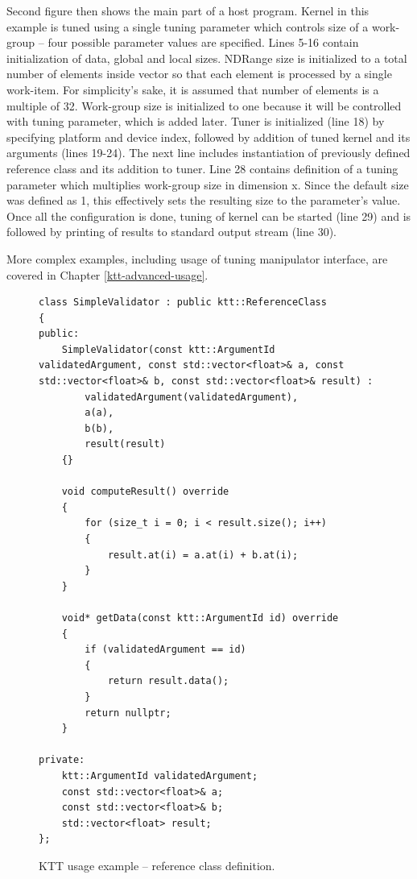 \documentclass
[
    digital, %
    oneside, %
    table, %
    nolof, %
    nolot, %
    nocover %
]{fithesis3}
\begin{document}
Second figure then shows the main part of a host program. Kernel in this example is tuned using a single tuning parameter which controls size of a
work-group -- four possible parameter values are specified. Lines 5-16 contain initialization of data, global and local sizes. NDRange size is
initialized to a total number of elements inside vector so that each element is processed by a single work-item. For simplicity's sake, it is assumed that
number of elements is a multiple of 32. Work-group size is initialized to one because it will be controlled with tuning parameter, which is added later.
Tuner is initialized (line 18) by specifying platform and device index, followed by addition of tuned kernel and its arguments (lines 19-24). The next
line includes instantiation of previously defined reference class and its addition to tuner. Line 28 contains definition of a tuning parameter which
multiplies work-group size in dimension x. Since the default size was defined as 1, this effectively sets the resulting size to the parameter's value.
Once all the configuration is done, tuning of kernel can be started (line 29) and is followed by printing of results to standard output stream (line 30).

More complex examples, including usage of tuning manipulator interface, are covered in Chapter \ref{ktt-advanced-usage}.

\begin{figure}
\footnotesize
\begin{adjustwidth}{-1cm}{-1cm}
\begin{lstlisting}
class SimpleValidator : public ktt::ReferenceClass
{
public:
    SimpleValidator(const ktt::ArgumentId validatedArgument, const std::vector<float>& a, const std::vector<float>& b, const std::vector<float>& result) :
        validatedArgument(validatedArgument),
        a(a),
        b(b),
        result(result)
    {}
    
    void computeResult() override
    {
        for (size_t i = 0; i < result.size(); i++)
        {
            result.at(i) = a.at(i) + b.at(i);
        }
    }
    
    void* getData(const ktt::ArgumentId id) override
    {
        if (validatedArgument == id)
        {
            return result.data();
        }
        return nullptr;
    }
    
private:
    ktt::ArgumentId validatedArgument;
    const std::vector<float>& a;
    const std::vector<float>& b;
    std::vector<float> result;
};
\end{lstlisting}
\caption{KTT usage example -- reference class definition.}
\label{ktt-api-usage-reference}
\end{adjustwidth}
\end{figure}
\end{document}
